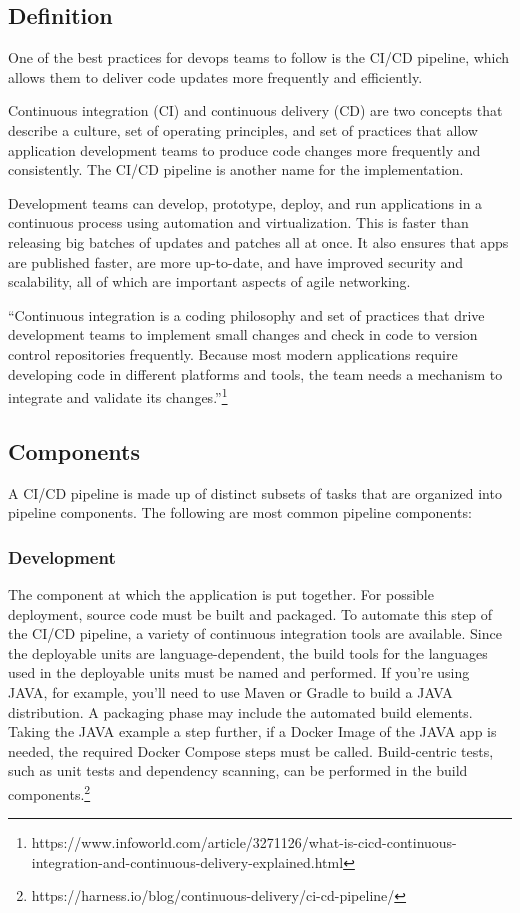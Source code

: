 \subsection{Definition}
%
One of the best practices for devops teams to follow is the CI/CD pipeline, which allows them to deliver code updates more frequently and efficiently.


Continuous integration (CI) and continuous delivery (CD) are two concepts that describe a culture, set of operating principles, and set of practices that allow application development teams to produce code changes more frequently and consistently. The CI/CD pipeline is another name for the implementation.

Development teams can develop, prototype, deploy, and run applications in a continuous process using automation and virtualization. This is faster than releasing big batches of updates and patches all at once. It also ensures that apps are published faster, are more up-to-date, and have improved security and scalability, all of which are important aspects of agile networking.

“Continuous integration is a coding philosophy and set of practices that drive development teams to implement small changes and check in code to version control repositories frequently. Because most modern applications require developing code in different platforms and tools, the team needs a mechanism to integrate and validate its changes.”\footnote{https://www.infoworld.com/article/3271126/what-is-cicd-continuous-integration-and-continuous-delivery-explained.html}

%
\subsection{Components}
%
A CI/CD pipeline is made up of distinct subsets of tasks that are organized into pipeline components. The following are most common pipeline components:

\subsubsection{Development}


The component at which the application is put together. For possible deployment, source code must be built and packaged. To automate this step of the CI/CD pipeline, a variety of continuous integration tools are available. Since the deployable units are language-dependent, the build tools for the languages used in the deployable units must be named and performed. If you're using JAVA, for example, you'll need to use Maven or Gradle to build a JAVA distribution. A packaging phase may include the automated build elements. Taking the JAVA example a step further, if a Docker Image of the JAVA app is needed, the required Docker Compose steps must be called. Build-centric tests, such as unit tests and dependency scanning, can be performed in the build components.\footnote{https://harness.io/blog/continuous-delivery/ci-cd-pipeline/}


